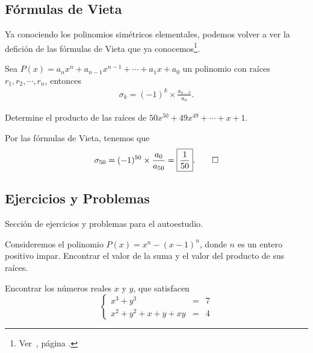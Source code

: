 \subsection{Fórmulas de Vieta}

Ya conociendo los polinomios simétricos elementales, podemos volver a ver la defición de las fórmulas de Vieta que ya conocemos\footnote{Ver~, página \pageref{vietas-formula}.}.

\begin{section-definition.tcb}
    Sea $P(x) = a_n x^n + a_{n - 1} x^{n - 1} + \cdots  + a_1 x + a_0$ un polinomio con raíces $r_1, r_2, \cdots, r_n$,
    entonces
    \begin{gather*}
        \sigma_k = (-1)^k\times \frac{a_{n - k}}{a_n}.
    \end{gather*}
\end{section-definition.tcb}

\begin{section-example.tcb}
    Determine el producto de las raíces de $50x^{50} + 49x^{49} + \cdots + x + 1.$
\end{section-example.tcb}
\begin{solution}
    Por las fórmulas de Vieta, tenemos que
    \[
        \sigma_{50} = (-1)^{50} \times \frac{a_0}{a_{50}} = \boxed{\frac{1}{50}}. \qedhere
    \]
\end{solution}



\subsection{Ejercicios y Problemas}

Sección de ejercicios y problemas para el autoestudio.

\begin{section-problem}
    Consideremos el polinomio $P(x) = x^n - (x - 1)^n$, donde $n$ es un entero positivo impar.
    Encontrar el valor de la suma y el valor del producto de sus raíces.
\end{section-problem}

\begin{section-problem}
    Encontrar los números reales $x$ y $y$, que satisfacen
    \[
        \left\{
        \begin{array}{rcl}
            x^3 + y^3 & =& 7\\
            x^2 + y^2 + x + y + xy & =& 4
        \end{array}
        \right.
    \]
\end{section-problem}

